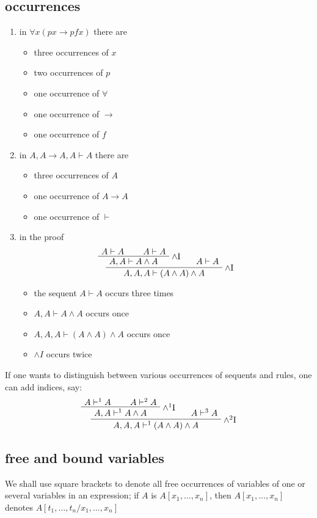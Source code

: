 \documentclass[11pt]{article}
\def \EBA {\EnableBpAbbreviations}
\def \RL[#1]{\RightLabel{#1}}
\begin{document}
\subsection{occurrences}
\label{sec:org29ef153}
\begin{enumerate}
\item in \(\forall x(px\to pfx)\) there are
\begin{itemize}
\item three occurrences of \(x\)
\item two occurrences of \(p\)
\item one occurrence of \(\forall\)
\item one occurrence of \(\to\)
\item one occurrence of \(f\)
\end{itemize}
\item in \(A,A\to A,A\vdash A\) there are
\begin{itemize}
\item three occurrences of \(A\)
\item one occurrence of \(A\to A\)
\item one occurrence of \(\vdash\)
\end{itemize}
\item in the proof
\begin{gather*}
\EBA\AXC{$A\vdash A$}
\AXC{$A\vdash A$}\RL{$\wedge$I}
\BIC{$A,A\vdash A\wedge A$}
\AXC{$A\vdash A$}\RL{$\wedge$I}
\BIC{$A,A,A\vdash(A\wedge A)\wedge A$}\DP
\end{gather*}
\begin{itemize}
\item the sequent \(A\vdash A\) occurs three times
\item \(A,A\vdash A\wedge A\) occurs once
\item \(A,A,A\vdash(A\wedge A)\wedge A\) occurs once
\item \(\wedge I\) occurs twice
\end{itemize}
\end{enumerate}


If one wants to distinguish between various occurrences of sequents and rules,
one can add indices, say:
\begin{gather*}
\EBA\AXC{$A\vdash^1 A$}
\AXC{$A\vdash^2 A$}\RL{$\wedge^1$I}
\BIC{$A,A\vdash^1 A\wedge A$}
\AXC{$A\vdash^3 A$}\RL{$\wedge^2$I}
\BIC{$A,A,A\vdash^1(A\wedge A)\wedge A$}\DP
\end{gather*}
\subsection{free and bound variables}
\label{sec:org8cefafe}
We shall use square brackets to denote all free occurrences of variables of one
or several variables in an expression; if \(A\) is \(A[x_1,\dots,x_n]\), then
\(A[x_1,\dots,x_n]\) denotes \(A[t_1,\dots,t_n/x_1,\dots,x_n]\)
\end{document}
